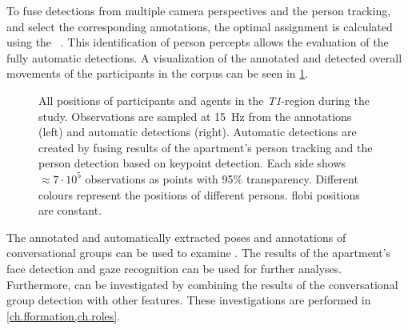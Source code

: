 To fuse detections from multiple camera perspectives and the person tracking, and select the corresponding annotations, the optimal assignment is calculated using the ~.
This identification of person percepts allows the evaluation of the fully automatic detections.
A visualization of the annotated and detected overall movements of the participants in the corpus can be seen in \cref{fig:group-person-movement}.
\begin{figure}[htb]
    \centering
    \def\svgwidth{1.0\textwidth}
    
    \caption[Movements in annotation and detection.]{\label{fig:group-person-movement}
    All positions of participants and agents in the \emph{T1}-region during the study.
    Observations are sampled at \SI{15}{\Hz} from the annotations (left) and automatic detections (right).
    Automatic detections are created by fusing results of the \gls{apartment}'s person tracking and the person detection based on  keypoint detection.
    Each side shows \(\approx7\cdot10^5\) observations as points with 95\% transparency.
    Different colours represent the positions of different persons.
    \Gls{flobi} positions are constant.
    }
\end{figure}

The annotated and automatically extracted poses and annotations of \glspl{conversational group} can be used to examine .
The results of the \gls{apartment}'s face detection and gaze recognition can be used for further analyses.
Furthermore,  can be investigated by combining the results of the \gls{conversational group} detection with other features.
These investigations are performed in \cref{ch.fformation,ch.roles}.
